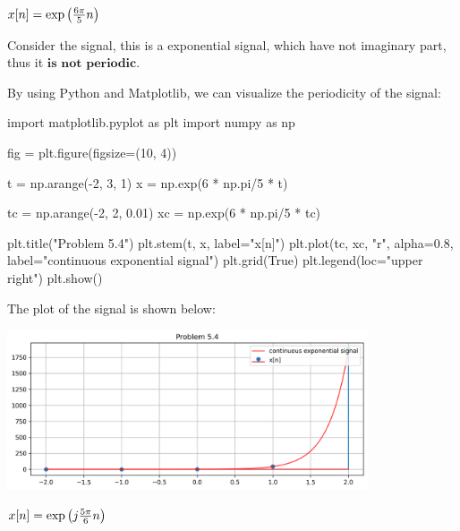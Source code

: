 \documentclass[a4paper, 10pt]{article}
\begin{document}
\newpage

\begin{subproblems}[start=4]
    \item \( x[n] = \exp \left( \frac{6\pi}{5}n \right) \)
\end{subproblems}

\begin{solution}

Consider the signal, this is a exponential signal, which have not imaginary part, thus it \( \boxed{\textbf{is not periodic}} \).

\vspace{5mm}

By using Python and Matplotlib, we can visualize the periodicity of the signal:
\begin{codingbox}
import matplotlib.pyplot as plt
import numpy as np

fig = plt.figure(figsize=(10, 4))

t = np.arange(-2, 3, 1)
x = np.exp(6 * np.pi/5 * t)

tc = np.arange(-2, 2, 0.01)
xc = np.exp(6 * np.pi/5 * tc)

plt.title("Problem 5.4")
plt.stem(t, x, label="x[n]")
plt.plot(tc, xc, "r", alpha=0.8, label="continuous exponential signal")
plt.grid(True)
plt.legend(loc="upper right")
plt.show()
\end{codingbox}

The plot of the signal is shown below:
\begin{center}
    \includegraphics[width=0.8\textwidth]{images/problem_5_4.png}
\end{center}
\end{solution}

\newpage

\begin{subproblems}[start=5]
    \item \( x[n] = \exp \left( j\frac{5\pi}{6}n \right) \)
\end{subproblems}
\end{document}
